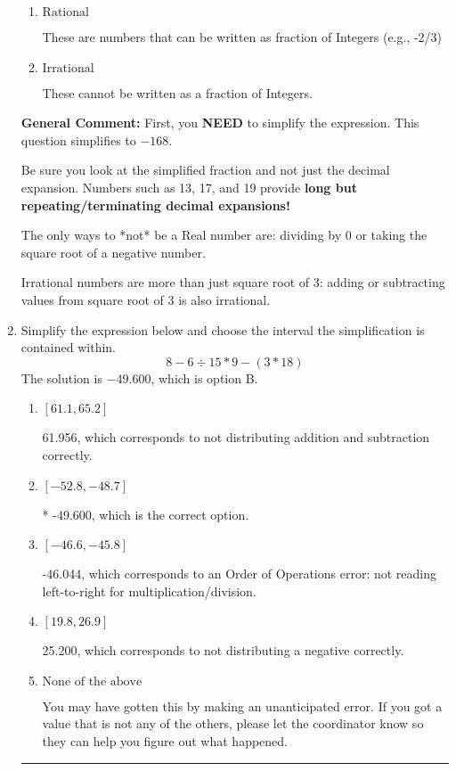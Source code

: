 \documentclass{extbook}[14pt]
\newcommand{\litem}[1]{\item #1

\rule{\textwidth}{0.4pt}}
\begin{document}
\begin{enumerate}
{\begin{enumerate}[label=\Alph*.]
These are Nonreal Complex numbers \textbf{OR} things that are not numbers (e.g., dividing by 0).
\item \( \text{Rational} \)

These are numbers that can be written as fraction of Integers (e.g., -2/3)
\item \( \text{Irrational} \)

These cannot be written as a fraction of Integers.
\end{enumerate}

\textbf{General Comment:} First, you \textbf{NEED} to simplify the expression. This question simplifies to $-168$. 
 
 Be sure you look at the simplified fraction and not just the decimal expansion. Numbers such as 13, 17, and 19 provide \textbf{long but repeating/terminating decimal expansions!} 
 
 The only ways to *not* be a Real number are: dividing by 0 or taking the square root of a negative number. 
 
 Irrational numbers are more than just square root of 3: adding or subtracting values from square root of 3 is also irrational.
}
\litem{
Simplify the expression below and choose the interval the simplification is contained within.
\[ 8 - 6 \div 15 * 9 - (3 * 18) \]The solution is \( -49.600 \), which is option B.\begin{enumerate}[label=\Alph*.]
\item \( [61.1, 65.2] \)

 61.956, which corresponds to not distributing addition and subtraction correctly.
\item \( [-52.8, -48.7] \)

* -49.600, which is the correct option.
\item \( [-46.6, -45.8] \)

 -46.044, which corresponds to an Order of Operations error: not reading left-to-right for multiplication/division.
\item \( [19.8, 26.9] \)

 25.200, which corresponds to not distributing a negative correctly.
\item \( \text{None of the above} \)

 You may have gotten this by making an unanticipated error. If you got a value that is not any of the others, please let the coordinator know so they can help you figure out what happened.
\end{enumerate}

}
\end{enumerate}
\end{document}
